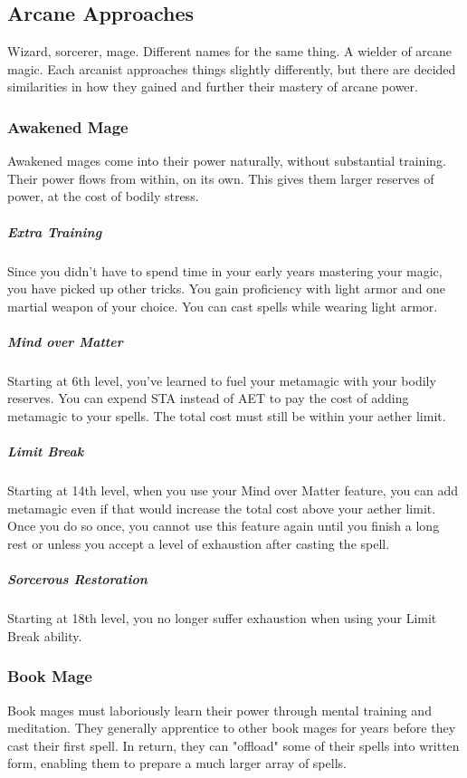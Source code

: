 \subsection{Arcane Approaches}

Wizard, sorcerer, mage. Different names for the same thing. A wielder of arcane magic. Each arcanist approaches things slightly differently, but there are decided similarities in how they gained and further their mastery of arcane power.

\subsubsection{Awakened Mage}
Awakened mages come into their power naturally, without substantial training. Their power flows from within, on its own. This gives them larger reserves of power, at the cost of bodily stress. 

\subparagraph*{Extra Training}
Since you didn't have to spend time in your early years mastering your magic, you have picked up other tricks. You gain proficiency with light armor and one martial weapon of your choice. You can cast spells while wearing light armor.

\subparagraph*{Mind over Matter}
Starting at 6th level, you've learned to fuel your metamagic with your bodily reserves. You can expend STA instead of AET to pay the cost of adding metamagic to your spells. The total cost must still be within your aether limit.

\subparagraph*{Limit Break}
Starting at 14th level, when you use your Mind over Matter feature, you can add metamagic even if that would increase the total cost above your aether limit. Once you do so once, you cannot use this feature again until you finish a long rest or unless you accept a level of exhaustion after casting the spell.

\subparagraph*{Sorcerous Restoration}
Starting at 18th level, you no longer suffer exhaustion when using your Limit Break ability.

\subsubsection{Book Mage}
Book mages must laboriously learn their power through mental training and meditation. They generally apprentice to other book mages for years before they cast their first spell. In return, they can "offload" some of their spells into written form, enabling them to prepare a much larger array of spells.

